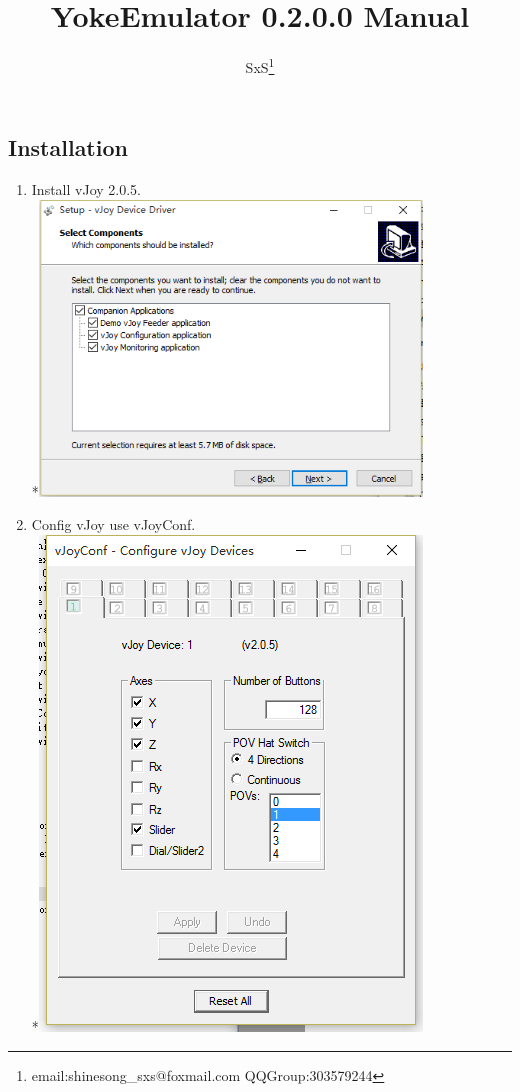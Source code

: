 \documentclass[12pt,a4paper]{article}
\title{YokeEmulator 0.2.0.0 Manual}
\author{SxS\footnote{email:shinesong\_sxs@foxmail.com QQGroup:303579244}}
\begin{document}
\begin{CJK}{UTF8}{gbsn}
\maketitle

\section{Installation}
\begin{enumerate}
\item Install vJoy 2.0.5.
\\*\includegraphics[width=4in]{install_vjoy.png}
\item Config vJoy use vJoyConf.
\\*\includegraphics[width=4in]{install_config_vjoy.png}

\end{enumerate}
\end{CJK}
\end{document}
